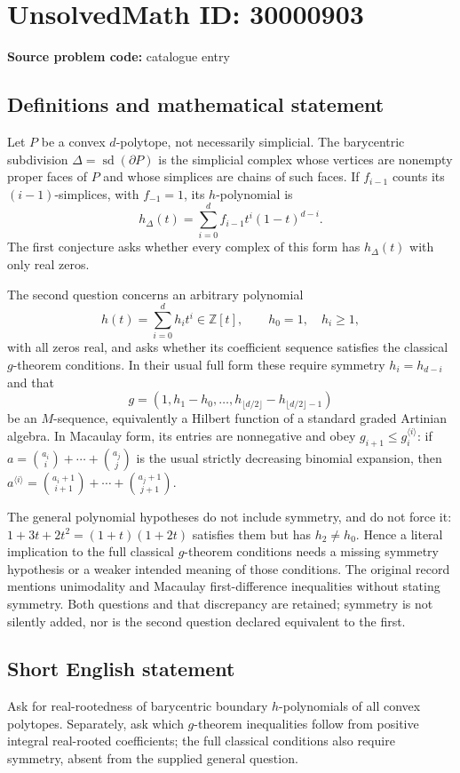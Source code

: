 \documentclass[11pt]{article}
\newcommand{\Z}{\mathbb{Z}}
\begin{document}
\section*{UnsolvedMath ID: 30000903}
\textbf{Source problem code:} catalogue entry
\subsection{Definitions and mathematical statement}
Let $P$ be a convex $d$-polytope, not necessarily simplicial. The barycentric subdivision $\Delta=\operatorname{sd}(\partial P)$ is the simplicial complex whose vertices are nonempty proper faces of $P$ and whose simplices are chains of such faces. If $f_{i-1}$ counts its $(i-1)$-simplices, with $f_{-1}=1$, its $h$-polynomial is
\[
h_\Delta(t)=\sum_{i=0}^{d}f_{i-1}t^i(1-t)^{d-i}.
\]
The first conjecture asks whether every complex of this form has $h_\Delta(t)$ with only real zeros.

The second question concerns an arbitrary polynomial
\[
h(t)=\sum_{i=0}^{d}h_i t^i\in\Z[t],\qquad h_0=1,\quad h_i\geq1,
\]
with all zeros real, and asks whether its coefficient sequence satisfies the classical $g$-theorem conditions. In their usual full form these require symmetry $h_i=h_{d-i}$ and that
\[
g=(1,h_1-h_0,\ldots,h_{\lfloor d/2\rfloor}-h_{\lfloor d/2\rfloor-1})
\]
be an $M$-sequence, equivalently a Hilbert function of a standard graded Artinian algebra. In Macaulay form, its entries are nonnegative and obey $g_{i+1}\leq g_i^{\langle i\rangle}$: if $a=\binom{a_i}{i}+\cdots+\binom{a_j}{j}$ is the usual strictly decreasing binomial expansion, then $a^{\langle i\rangle}=\binom{a_i+1}{i+1}+\cdots+\binom{a_j+1}{j+1}$.

The general polynomial hypotheses do not include symmetry, and do not force it: $1+3t+2t^2=(1+t)(1+2t)$ satisfies them but has $h_2\ne h_0$. Hence a literal implication to the full classical $g$-theorem conditions needs a missing symmetry hypothesis or a weaker intended meaning of those conditions. The original record mentions unimodality and Macaulay first-difference inequalities without stating symmetry. Both questions and that discrepancy are retained; symmetry is not silently added, nor is the second question declared equivalent to the first.
\subsection{Short English statement}
Ask for real-rootedness of barycentric boundary $h$-polynomials of all convex polytopes. Separately, ask which $g$-theorem inequalities follow from positive integral real-rooted coefficients; the full classical conditions also require symmetry, absent from the supplied general question.
\end{document}
